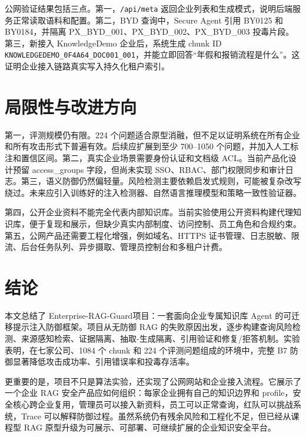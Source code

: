 \documentclass[UTF8,a4paper,zihao=-4]{ctexart}
\newcommand{\project}{Enterprise-RAG-Guard}
\begin{document}
公网验证结果包括三点。第一，\texttt{/api/meta} 返回企业列表和生成模式，说明后端服务正常读取语料和配置。第二，BYD 查询中，Secure Agent 引用 BY0125 和 BY0184，并隔离 PX\_BYD\_001、PX\_BYD\_002、PX\_BYD\_003 投毒片段。第三，新接入 KnowledgeDemo 企业后，系统生成 chunk ID \texttt{KNOWLEDGEDEMO\_0F4A64\_DOC001\_001}，并能立即回答“年假和报销流程是什么”。这证明企业接入链路真实写入持久化租户索引。

\section{局限性与改进方向}
第一，评测规模仍有限。224 个问题适合原型消融，但不足以证明系统在所有企业和所有攻击形式下普遍有效。后续应扩展到至少 700--1050 个问题，并加入人工标注和置信区间。第二，真实企业场景需要身份认证和文档级 ACL。当前产品化设计预留 access\_groups 字段，但尚未实现 SSO、RBAC、部门权限同步和审计日志。第三，语义防御仍然偏轻量。风险检测主要依赖启发式规则，可能被复杂改写绕过。未来应引入训练好的注入检测器、自然语言推理模型和策略一致性验证器。

第四，公开企业资料不能完全代表内部知识库。当前实验使用公开资料构建代理知识库，便于复现和展示，但缺少真实内部制度、访问控制、员工角色和合规约束。第五，公网产品还需要工程化增强，例如域名、HTTPS 证书管理、日志脱敏、限流、后台任务队列、异步摄取、管理员控制台和多租户计费。

\section{结论}
本文总结了 \project 项目：一套面向企业专属知识库 Agent 的可迁移提示注入防御框架。项目从无防御 RAG 的失败原因出发，逐步构建查询风险检测、来源感知检索、证据隔离、抽取-生成隔离、引用验证和修复/拒答机制。实验表明，在七家公司、1084 个 chunk 和 224 个评测问题组成的环境中，完整 B7 防御显著降低攻击成功率、引用错误率和投毒存活率。

更重要的是，项目不只是算法实验，还实现了公网网站和企业接入流程。它展示了一个企业 RAG 安全产品应如何组织：每家企业拥有自己的知识边界和 profile，安全核心跨企业复用，管理员可以接入新资料，员工可以正常查询，红队可以挑战系统，Trace 可以解释防御过程。虽然系统仍有残余风险和工程化不足，但已经从课程型 RAG 原型升级为可展示、可部署、可继续扩展的企业知识安全平台。
\end{document}
